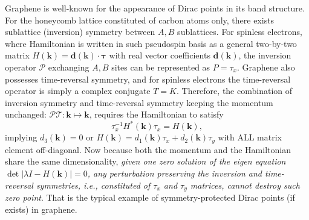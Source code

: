 Graphene is well-known for the appearance of Dirac points in its band structure. For the honeycomb lattice constituted of carbon atoms only, there exists sublattice (inversion) symmetry between $A,B$ sublattices. For spinless electrons, where Hamiltonian is written in such pseudospin basis as a general two-by-two matrix $H(\bm k)=\bm d(\bm k)\cdot\bm \tau$ with real vector coefficients $\bm d(\bm k)$, the inversion operator $\mathcal P$ exchanging $A,B$ sites can be represented as $P=\tau_x$. Graphene also possesses time-reversal symmetry, and for spinless electrons the time-reversal operator is simply a complex conjugate $T=K$. Therefore, the combination of inversion symmetry and time-reversal symmetry keeping the momentum unchanged: $\mathcal P\mathcal T:\bm k\mapsto\bm k$, requires the Hamiltonian to satisfy
\begin{equation*}
    \tau_x^{-1}H^*(\bm k)\tau_x=H(\bm k),
\end{equation*}
implying $d_3(\bm k)=0$ or $H(\bm k)=d_1(\bm k)\tau_x+d_2(\bm k)\tau_y$ with ALL matrix element off-diagonal. Now because both the momentum and the Hamiltonian share the same dimensionality, \emph{given one zero solution of the eigen equation $\det|\lambda I-H(\bm k)|=0$, any perturbation preserving the inversion and time-reversal symmetries, i.e., constituted of $\tau_x$ and $\tau_y$ matrices, cannot destroy such zero point}. That is the typical example of symmetry-protected Dirac points (if exists) in graphene.

